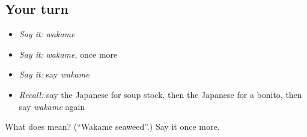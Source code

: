 \subsection*{Your turn}
\begin{itemize}
\raggedright
  \item \emph{Say it:} \emph{wakame}
  \item \emph{Say it:} \emph{wakame}, once more
  \item \emph{Say it:} say \emph{wakame}
  \item \emph{Recall:} say the Japanese for soup stock, then the Japanese for a bonito, then say \emph{wakame} again
\end{itemize}

\begin{tcolorbox}[breakable,colback=teal!4,colframe=teal!35!black,title={Before you move on}]
What does  mean? (\textquotedblleft{}Wakame seaweed\textquotedblright{}.) Say it once more.
\end{tcolorbox}
